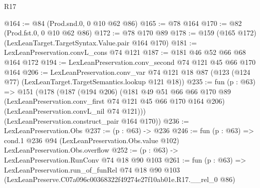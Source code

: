 \begin{lexlean}{R17}
\begin{coremodule}
@164 := @84 (Prod.snd.{0, 0} @10 @62 @86)
@165 := @78 @164
@170 := @82 (Prod.fst.{0, 0} @10 @62 @86)
@172 := @78 @170 @89
@178 := @159 (@165 @172) (LexLeanTarget.TargetSyntax.Value.pair @164 @170)
@181 := LexLeanPreservation.convL_cons @74 @121
@187 := @181 @46 @52 @66 @68 @164 @172
@194 := LexLeanPreservation.conv_second @74 @121 @45 @66 @170 @164
@206 := LexLeanPreservation.conv_var
    @74
    @121
    @18
    @87
    (@123 (@124 @77) (LexLeanTarget.TargetSemantics.lookup @121 @18))
@235 := fun (p : @63) =>
  @151
    (@178
      (@187
        (@194 @206)
        (@181
          @49
          @51
          @66
          @66
          @170
          @89
          (LexLeanPreservation.conv_first @74 @121 @45 @66 @170 @164 @206)
          (LexLeanPreservation.convL_nil @74 @121)))
      (LexLeanPreservation.construct_pair @164 @170))
@236 := LexLeanPreservation.Obs
@237 := (p : @63) -> @236
@246 := fun (p : @63) =>
  cond.{1} @236 @94 (LexLeanPreservation.Obs.value @102) LexLeanPreservation.Obs.overflow
@252 := (p : @63) -> LexLeanPreservation.RunConv @74 @18 @90 @103
@261 := fun (p : @63) =>
  LexLeanPreservation.run_of_funRel
    @74
    @18
    @90
    @103
    (LexLeanPreserve.C07a096c00368322f49274e27f10ab01e.R17.__rel_0 @86)
\end{coremodule}
\end{lexlean}
